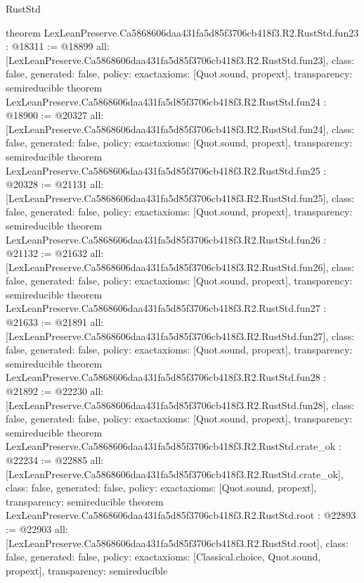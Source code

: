 \begin{lexlean}{RustStd}
\begin{coremodule}
{}
theorem LexLeanPreserve.Ca5868606daa431fa5d85f3706cb418f3.R2.RustStd.fun23 : @18311 := @18899 {
  all: [LexLeanPreserve.Ca5868606daa431fa5d85f3706cb418f3.R2.RustStd.fun23],
  class: false,
  generated: false,
  policy: exact{axioms: [Quot.sound, propext]},
  transparency: semireducible
}
theorem LexLeanPreserve.Ca5868606daa431fa5d85f3706cb418f3.R2.RustStd.fun24 : @18900 := @20327 {
  all: [LexLeanPreserve.Ca5868606daa431fa5d85f3706cb418f3.R2.RustStd.fun24],
  class: false,
  generated: false,
  policy: exact{axioms: [Quot.sound, propext]},
  transparency: semireducible
}
theorem LexLeanPreserve.Ca5868606daa431fa5d85f3706cb418f3.R2.RustStd.fun25 : @20328 := @21131 {
  all: [LexLeanPreserve.Ca5868606daa431fa5d85f3706cb418f3.R2.RustStd.fun25],
  class: false,
  generated: false,
  policy: exact{axioms: [Quot.sound, propext]},
  transparency: semireducible
}
theorem LexLeanPreserve.Ca5868606daa431fa5d85f3706cb418f3.R2.RustStd.fun26 : @21132 := @21632 {
  all: [LexLeanPreserve.Ca5868606daa431fa5d85f3706cb418f3.R2.RustStd.fun26],
  class: false,
  generated: false,
  policy: exact{axioms: [Quot.sound, propext]},
  transparency: semireducible
}
theorem LexLeanPreserve.Ca5868606daa431fa5d85f3706cb418f3.R2.RustStd.fun27 : @21633 := @21891 {
  all: [LexLeanPreserve.Ca5868606daa431fa5d85f3706cb418f3.R2.RustStd.fun27],
  class: false,
  generated: false,
  policy: exact{axioms: [Quot.sound, propext]},
  transparency: semireducible
}
theorem LexLeanPreserve.Ca5868606daa431fa5d85f3706cb418f3.R2.RustStd.fun28 : @21892 := @22230 {
  all: [LexLeanPreserve.Ca5868606daa431fa5d85f3706cb418f3.R2.RustStd.fun28],
  class: false,
  generated: false,
  policy: exact{axioms: [Quot.sound, propext]},
  transparency: semireducible
}
theorem LexLeanPreserve.Ca5868606daa431fa5d85f3706cb418f3.R2.RustStd.crate_ok : @22234 := @22885 {
  all: [LexLeanPreserve.Ca5868606daa431fa5d85f3706cb418f3.R2.RustStd.crate_ok],
  class: false,
  generated: false,
  policy: exact{axioms: [Quot.sound, propext]},
  transparency: semireducible
}
theorem LexLeanPreserve.Ca5868606daa431fa5d85f3706cb418f3.R2.RustStd.root : @22893 := @22903 {
  all: [LexLeanPreserve.Ca5868606daa431fa5d85f3706cb418f3.R2.RustStd.root],
  class: false,
  generated: false,
  policy: exact{axioms: [Classical.choice, Quot.sound, propext]},
  transparency: semireducible
}


\end{coremodule}
\end{lexlean}
